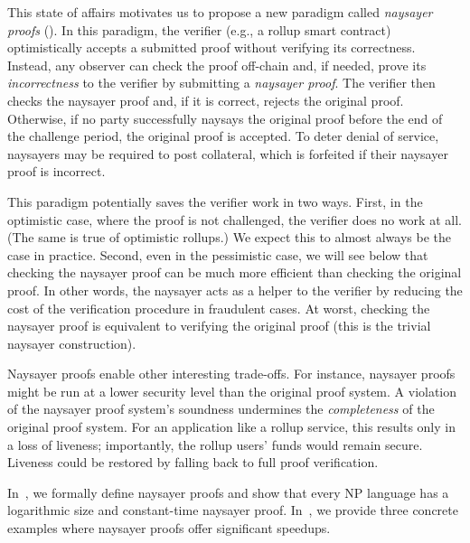 This state of affairs motivates us to propose a new paradigm called \emph{naysayer proofs} (). In this paradigm, the verifier (e.g., a rollup smart contract) optimistically accepts a submitted proof without verifying its correctness. Instead, any observer can check the proof off-chain and, if needed, prove its \emph{incorrectness} to the verifier by submitting a \emph{naysayer proof}. The verifier then checks the naysayer proof and, if it is correct, rejects the original proof.
Otherwise, if no party successfully naysays the original proof before the end of the challenge period, the original proof is accepted.
To deter denial of service, naysayers may be required to post collateral, which is forfeited if their naysayer proof is incorrect.

This paradigm potentially saves the verifier work in two ways. 
First, in the optimistic case, where the proof is not challenged, the verifier does no work at all. (The same is true of optimistic rollups.) We expect this to almost always be the case in practice. Second, even in the pessimistic case, we will see below that checking the naysayer proof can be much more efficient than checking the original proof. In other words, the naysayer acts as a helper to the verifier by reducing the cost of the verification procedure in fraudulent cases. At worst, checking the naysayer proof is equivalent to verifying the original proof (this is the trivial naysayer construction).

Naysayer proofs enable other interesting trade-offs. 
For instance, naysayer proofs might be run at a lower security level than the original proof system.
A violation of the naysayer proof system's soundness undermines the \emph{completeness} of the original proof system. %
For an application like a rollup service, this results only in a loss of liveness; importantly, the rollup users' funds would remain secure. 
Liveness could be restored by falling back to full proof verification.


In~, we formally define naysayer proofs and show that every NP language has a logarithmic size and constant-time naysayer proof. In~, we provide three concrete examples where naysayer proofs offer significant speedups. %
